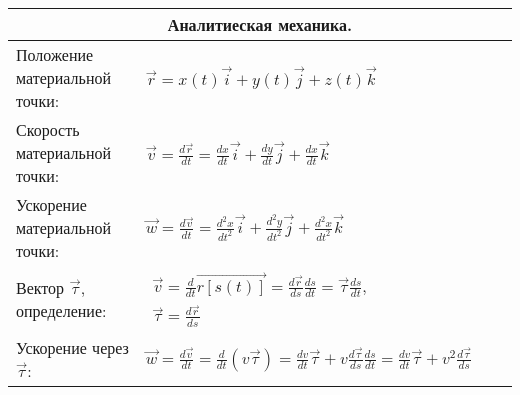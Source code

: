 \documentclass{article}
\begin{document}
\begin{tabular}{ |p{4cm}|p{5.5cm}|p{6cm}|p{3.5cm}|  }
\hline
\multicolumn{4}{|c|}{Аналитиеская механика.} \\
\hline
Положение материальной точки:                                                &  %
$\vec{r} = x(t) \vec{i} + y(t) \vec{j} + z(t) \vec{k}$                       &  %
                                                                             &  %
                                                                             \\ %
\hline
Скорость материальной точки:                                                 &  %
$\vec{v} = \frac{d{\vec{r}}}{dt} =
\frac{dx}{dt} \vec{i} + \frac{dy}{dt} \vec{j} + \frac{dx}{dt} \vec{k}$       &  %
                                                                             &  %
                                                                             \\ %
\hline
Ускорение материальной точки:                                                &  %
$\vec{w} = \frac{d{\vec{v}}}{dt} =
\frac{d^2 x}{dt^2} \vec{i} +
\frac{d^2 y}{dt^2} \vec{j} + \frac{d^2 x}{dt^2} \vec{k}$                     &  %
                                                                             &  %
                                                                             \\ %
\hline
Вектор $\vec{\tau}$, определение:                                            &  %
$\begin{aligned}
\vec{v} = \frac{d}{dt} \vec{r[s(t)]} =                         
\frac{d\vec{r}}{ds} \frac{ds}{dt} = \vec{\tau} \frac{ds}{dt},   \\
\vec{\tau} = \frac{d\vec{r}}{ds}
\end{aligned}$                                                               &  %
                                                                             &  %
                                                                             \\ %
\hline
Ускорение через $\vec{\tau}$:                                                &  %
$\vec{w} = \frac{d\vec{v}}{dt} =
\frac{d}{dt} (v \vec{\tau}) =
\frac{dv}{dt} \vec{\tau} + v \frac{d\vec{\tau}}{ds} \frac{ds}{dt} =
\frac{dv}{dt} \vec{\tau} + v^2 \frac{d \vec{\tau}}{ds}$                      &  %
                                                                             &  %

\end{tabular}
\end{document}
